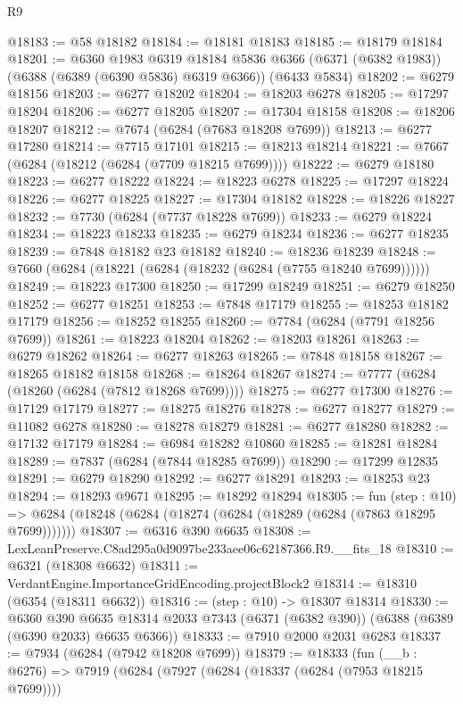 \begin{lexlean}{R9}
\begin{coremodule}
@18183 := @58 @18182
@18184 := @18181 @18183
@18185 := @18179 @18184
@18201 := @6360
    @1983
    @6319
    @18184
    @5836
    @6366
    (@6371 (@6382 @1983))
    (@6388 (@6389 (@6390 @5836) @6319 @6366))
    (@6433 @5834)
@18202 := @6279 @18156
@18203 := @6277 @18202
@18204 := @18203 @6278
@18205 := @17297 @18204
@18206 := @6277 @18205
@18207 := @17304 @18158
@18208 := @18206 @18207
@18212 := @7674 (@6284 (@7683 @18208 @7699))
@18213 := @6277 @17280
@18214 := @7715 @17101
@18215 := @18213 @18214
@18221 := @7667 (@6284 (@18212 (@6284 (@7709 @18215 @7699))))
@18222 := @6279 @18180
@18223 := @6277 @18222
@18224 := @18223 @6278
@18225 := @17297 @18224
@18226 := @6277 @18225
@18227 := @17304 @18182
@18228 := @18226 @18227
@18232 := @7730 (@6284 (@7737 @18228 @7699))
@18233 := @6279 @18224
@18234 := @18223 @18233
@18235 := @6279 @18234
@18236 := @6277 @18235
@18239 := @7848 @18182 @23 @18182
@18240 := @18236 @18239
@18248 := @7660 (@6284 (@18221 (@6284 (@18232 (@6284 (@7755 @18240 @7699))))))
@18249 := @18223 @17300
@18250 := @17299 @18249
@18251 := @6279 @18250
@18252 := @6277 @18251
@18253 := @7848 @17179
@18255 := @18253 @18182 @17179
@18256 := @18252 @18255
@18260 := @7784 (@6284 (@7791 @18256 @7699))
@18261 := @18223 @18204
@18262 := @18203 @18261
@18263 := @6279 @18262
@18264 := @6277 @18263
@18265 := @7848 @18158
@18267 := @18265 @18182 @18158
@18268 := @18264 @18267
@18274 := @7777 (@6284 (@18260 (@6284 (@7812 @18268 @7699))))
@18275 := @6277 @17300
@18276 := @17129 @17179
@18277 := @18275 @18276
@18278 := @6277 @18277
@18279 := @11082 @6278
@18280 := @18278 @18279
@18281 := @6277 @18280
@18282 := @17132 @17179
@18284 := @6984 @18282 @10860
@18285 := @18281 @18284
@18289 := @7837 (@6284 (@7844 @18285 @7699))
@18290 := @17299 @12835
@18291 := @6279 @18290
@18292 := @6277 @18291
@18293 := @18253 @23
@18294 := @18293 @9671
@18295 := @18292 @18294
@18305 := fun (step : @10) =>
  @6284 (@18248 (@6284 (@18274 (@6284 (@18289 (@6284 (@7863 @18295 @7699)))))))
@18307 := @6316 @390 @6635
@18308 := LexLeanPreserve.C8ad295a0d9097be233aee06c62187366.R9.__fits_18
@18310 := @6321 (@18308 @6632)
@18311 := VerdantEngine.ImportanceGridEncoding.projectBlock2
@18314 := @18310 (@6354 (@18311 @6632))
@18316 := (step : @10) -> @18307 @18314
@18330 := @6360
    @390
    @6635
    @18314
    @2033
    @7343
    (@6371 (@6382 @390))
    (@6388 (@6389 (@6390 @2033) @6635 @6366))
@18333 := @7910 @2000 @2031 @6283
@18337 := @7934 (@6284 (@7942 @18208 @7699))
@18379 := @18333
    (fun (__b : @6276) =>
    @7919
      (@6284
        (@7927
          (@6284 (@18337 (@6284 (@7953 @18215 @7699))))

\end{coremodule}
\end{lexlean}
